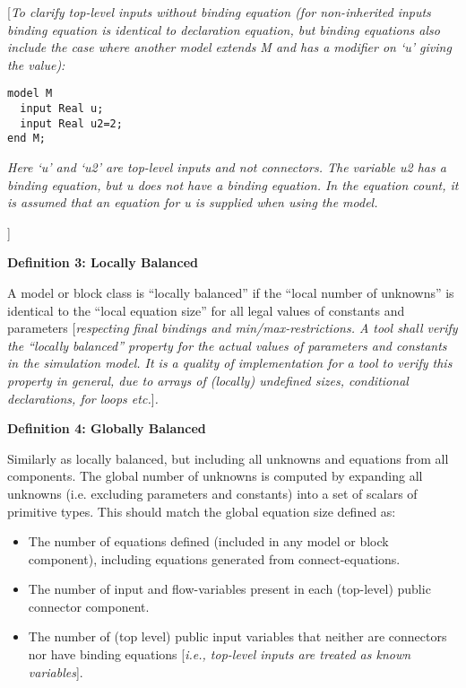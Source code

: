 {[}\emph{To clarify top-level inputs without binding equation (for
non-inherited inputs binding equation is identical to declaration
equation, but binding equations also include the case where another
model extends M and has a modifier on `u' giving the value):}

\begin{lstlisting}[language=modelica]
model M
  input Real u;
  input Real u2=2;
end M;
\end{lstlisting}

\emph{Here `u' and `u2' are top-level inputs and not connectors. The
variable u2 has a binding equation, but u does not have a binding
equation. In the equation count, it is assumed that an equation for u is
supplied when using the model.}

{]}

\textbf{Definition 3: Locally Balanced}

A model or block class is ``locally balanced'' if the ``local number of
unknowns'' is identical to the ``local equation size'' for all legal
values of constants and parameters {[}\emph{respecting final bindings
and min/max-restrictions. A tool shall verify the ``locally balanced''
property for the actual values of parameters and constants in the
simulation model. It is a quality of implementation for a tool to verify
this property in general, due to arrays of (locally) undefined sizes,
conditional declarations, for loops etc.}{]}\emph{.}

\textbf{Definition 4: Globally Balanced}

Similarly as locally balanced, but including all unknowns and equations
from all components. The global number of unknowns is computed by
expanding all unknowns (i.e. excluding parameters and constants) into a
set of scalars of primitive types. This should match the global equation
size defined as:

\begin{itemize}
\item
  The number of equations defined (included in any model or block
  component), including equations generated from connect-equations.
\item
  The number of input and flow-variables present in each (top-level)
  public connector component.
\item
  The number of (top level) public input variables that neither are
  connectors nor have binding equations {[}\emph{i.e., top-level inputs
  are treated as known variables}{]}.
\end{itemize}

